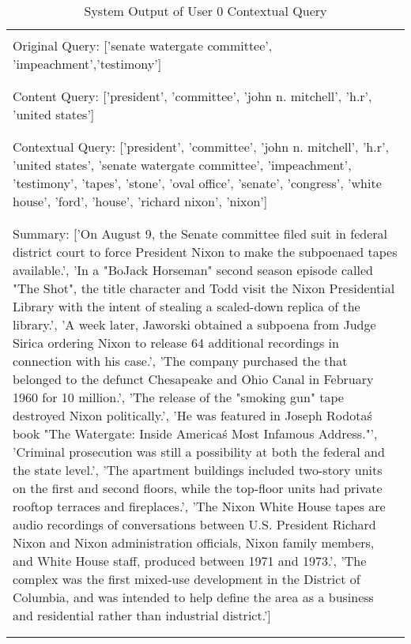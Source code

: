 \RaggedRight
\begin{table}[h]
    \caption{System Output of User 0 Contextual Query}
    \label{tab:u0}
    \centering
    \begin{tabular}{ Y } \hline \\
    Original Query: ['senate watergate committee', 'impeachment','testimony'] \Tstrut\Bstrut\\ \\ \hline \\
    Content Query: ['president', 'committee', 'john n. mitchell', 'h.r', 'united states']\Tstrut\Bstrut\\ \\ \hline \\
    Contextual Query: ['president', 'committee', 'john n. mitchell', 'h.r', 'united states', 'senate watergate committee', 'impeachment', 'testimony', 'tapes', 'stone', 'oval office', 'senate', 'congress', 'white house', 'ford', 'house', 'richard nixon', 'nixon'] \Tstrut\Bstrut\\ \\ \hline \\ 
    Summary: ['On August 9, the Senate committee filed suit in federal district court to force President Nixon to make the subpoenaed tapes available.', 'In a "BoJack Horseman" second season episode called "The Shot", the title character and Todd visit the Nixon Presidential Library with the intent of stealing a scaled-down replica of the library.', 'A week later, Jaworski obtained a subpoena from Judge Sirica ordering Nixon to release 64 additional recordings in connection with his case.', 'The company purchased the that belonged to the defunct Chesapeake and Ohio Canal in February 1960 for 10 million.', 'The release of the "smoking gun" tape destroyed Nixon politically.', 'He was featured in Joseph Rodota\'s book "The Watergate: Inside America\'s Most Infamous Address."', 'Criminal prosecution was still a possibility at both the federal and the state level.', 'The apartment buildings included two-story units on the first and second floors, while the top-floor units had private rooftop terraces and fireplaces.', 'The Nixon White House tapes are audio recordings of conversations between U.S. President Richard Nixon and Nixon administration officials, Nixon family members, and White House staff, produced between 1971 and 1973.', 'The complex was the first mixed-use development in the District of Columbia, and was intended to help define the area as a business and residential rather than industrial district.']\Tstrut\Bstrut\\ \\ \hline \\ 

\end{tabular}
\end{table}
